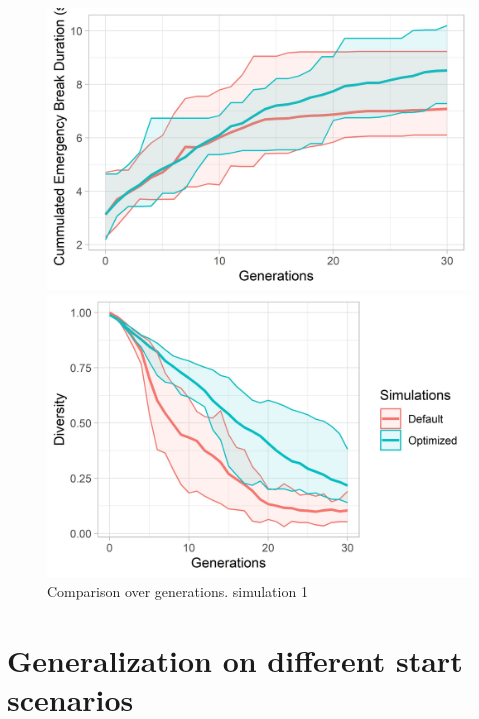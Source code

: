 \begin{figure}[ht] 
	\label{figure:sim_1_ga_comparison}
	\begin{minipage}[b]{0.5\linewidth}
		\centering
		\includegraphics[width=1\linewidth]{simulations/evaluation/plots/sim_1_ga_generations} 
	\end{minipage}%
	\begin{minipage}[b]{0.5\linewidth}
		\centering
		\includegraphics[width=1\linewidth]{simulations/evaluation/plots/sim_1_ga_diversity} 
	\end{minipage} 
	\caption{Comparison over generations. simulation 1}
\end{figure}


\section{Generalization on different start scenarios}

